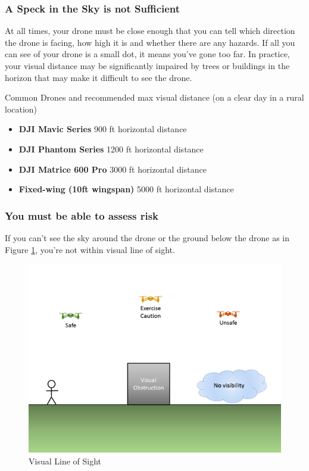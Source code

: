 \documentclass[
  12pt,
]{book}
\providecommand{\tightlist}{%
  \setlength{\itemsep}{0pt}\setlength{\parskip}{0pt}}
\begin{document}
\hypertarget{a-speck-in-the-sky-is-not-sufficient}{%
\subsubsection{A Speck in the Sky is not Sufficient}\label{a-speck-in-the-sky-is-not-sufficient}}

At all times, your drone must be close enough that you can tell which direction the drone is facing, how high it is and whether there are any hazards. If all you can see of your drone is a small dot, it means you've gone too far. In practice, your visual distance may be significantly impaired by trees or buildings in the horizon that may make it difficult to see the drone.

Common Drones and recommended max visual distance (on a clear day in a rural location)

\begin{itemize}
\tightlist
\item
  \textbf{DJI Mavic Series} 900 ft horizontal distance
\item
  \textbf{DJI Phantom Series} 1200 ft horizontal distance
\item
  \textbf{DJI Matrice 600 Pro} 3000 ft horizontal distance
\item
  \textbf{Fixed-wing (10ft wingspan)} 5000 ft horizontal distance
\end{itemize}

\hypertarget{you-must-be-able-to-assess-risk}{%
\subsubsection{You must be able to assess risk}\label{you-must-be-able-to-assess-risk}}

If you can't see the sky around the drone or the ground below the drone as in Figure \ref{fig:vlos}, you're not within visual line of sight.

\begin{figure}

{\centering \includegraphics[width=0.8\linewidth]{images/VLOS_G} 

}

\caption{Visual Line of Sight}\label{fig:vlos}
\end{figure}
\end{document}

